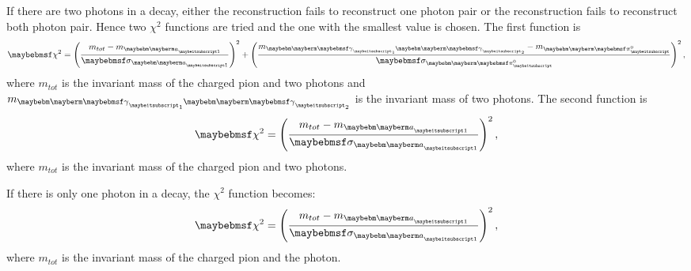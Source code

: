 If there are two photons in a decay, either the reconstruction fails to reconstruct one photon pair or the reconstruction fails to reconstruct both photon pair. Hence two $\chi^2$ functions are tried and the one with the smallest value is chosen. The first function is
\begin{equation}
\chi^{2} = {\left(\frac{m_{tot} -  m_{\Pai}}{\sigma_{\Pai}}\right)}^{2} + {\left(\frac{m_{\Pphoton_1 \Pphoton_2} -  m_{\Ppizero}}{\sigma_{\Ppizero}}\right)}^{2}  \,,
\end{equation}
where $m_{tot}$ is the invariant mass of the charged pion and two photons and $m_{\Pphoton_1 \Pphoton_2}$ is the invariant mass of two photons. The second function is
\begin{equation}
\chi^{2} = {\left(\frac{m_{tot} -  m_{\Pai}}{\sigma_{\Pai}}\right)}^{2} \,,
\end{equation}
where $m_{tot}$ is the invariant mass of the charged pion and two photons.


If there is only one photon in a decay, the $\chi^{2}$ function becomes:
\begin{equation}
\chi^{2} = {\left(\frac{m_{tot} -  m_{\Pai}}{\sigma_{\Pai}}\right)}^{2} \,,
\end{equation}
where $m_{tot}$ is the invariant mass of the charged pion and the photon.







